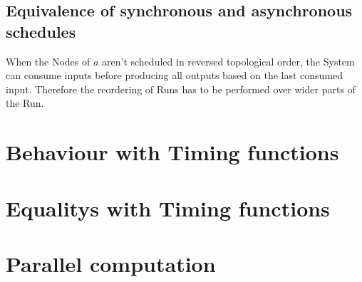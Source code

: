 \subsection{Equivalence of synchronous and asynchronous schedules}
\label{sec:concepts:equivalence_without_timing:sync_async}

When the Nodes of \(a\) aren't scheduled in reversed topological order, the System can consume inputs before producing all outputs based on the last consumed input.
Therefore the reordering of Runs has to be performed over wider parts of the Run.

\section{Behaviour with Timing functions}
\section{Equalitys with Timing functions}
\section{Parallel computation}
